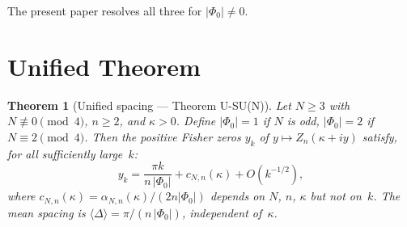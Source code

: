 \documentclass[12pt]{article}
\newtheorem{theorem}{Theorem}
\theoremstyle{remark}
\newcommand{\avg}[1]{\langle #1 \rangle}
\begin{document}
The present paper resolves all three for $|\Phi_0| \neq 0$.


\section{Unified Theorem}\label{sec:unified}

\begin{theorem}[Unified spacing --- Theorem U-SU(N)]\label{thm:unified}
Let $N \geq 3$ with $N \not\equiv 0 \pmod{4}$, $n \geq 2$, and $\kappa > 0$.
Define $|\Phi_0| = 1$ if $N$ is odd, $|\Phi_0| = 2$ if $N \equiv 2 \pmod{4}$.
Then the positive Fisher zeros $y_k$ of $y \mapsto Z_n(\kappa + iy)$ satisfy,
for all sufficiently large~$k$:
\begin{equation}\label{eq:unified}
  y_k = \frac{\pi k}{n\,|\Phi_0|} + c_{N,n}(\kappa) + O(k^{-1/2}),
\end{equation}
where $c_{N,n}(\kappa) = \alpha_{N,n}(\kappa)/(2n|\Phi_0|)$ depends on $N$,
$n$, $\kappa$ but not on~$k$. The mean spacing is
$\avg{\Delta} = \pi/(n\,|\Phi_0|)$, independent of~$\kappa$.
\end{theorem}
\end{document}

